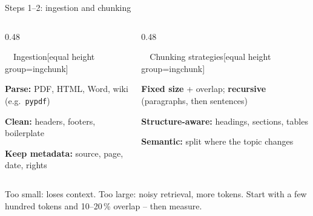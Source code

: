 \documentclass[aspectratio=169,11pt]{beamer}
\begin{document}
\begin{frame}{Steps 1--2: ingestion and chunking}
  \centering
  \par\vspace{8pt}
  \begin{columns}[T]
    \begin{column}{0.48\textwidth}
      \begin{card}[cBlue]{\smash{\faFileImport}\ \ Ingestion}[equal height group=ingchunk]
        \raggedright\footnotesize
        \textbf{Parse:} PDF, HTML, Word, wiki (e.g.\ \texttt{pypdf})\par
        \textbf{Clean:} headers, footers, boilerplate\par
        \textbf{Keep metadata:} source, page, date, rights
      \end{card}
    \end{column}
    \begin{column}{0.48\textwidth}
      \begin{card}[cTeal]{\smash{\faCut}\ \ Chunking strategies}[equal height group=ingchunk]
        \raggedright\footnotesize
        \textbf{Fixed size} + overlap; \textbf{recursive} (paragraphs, then sentences)\par
        \textbf{Structure-aware:} headings, sections, tables\par
        \textbf{Semantic:} split where the topic changes
      \end{card}
    \end{column}
  \end{columns}
  \vspace{6pt}
  \begin{keybox}
    \small Too small: loses context. Too large: noisy retrieval, more tokens. Start with a few hundred tokens and 10--20\,\% overlap -- then measure.

\end{keybox}
\end{frame}
\end{document}
